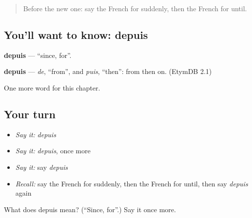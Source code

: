 \begin{quote}
Before the new one: say the French for suddenly, then the French for until.
\end{quote}

\subsection*{You'll want to know: depuis}
\textbf{depuis} — \textquotedblleft{}since, for\textquotedblright{}.

\begin{cousinweb}
\textbf{depuis} — \emph{de}, \textquotedblleft{}from\textquotedblright{}, and \emph{puis}, \textquotedblleft{}then\textquotedblright{}: from then on. (EtymDB 2.1)
\end{cousinweb}

\begin{grammarlens}[title={What you've built}]
One more word for this chapter.
\end{grammarlens}

\subsection*{Your turn}
\begin{itemize}
\raggedright
  \item \emph{Say it:} \emph{depuis}
  \item \emph{Say it:} \emph{depuis}, once more
  \item \emph{Say it:} say \emph{depuis}
  \item \emph{Recall:} say the French for suddenly, then the French for until, then say \emph{depuis} again
\end{itemize}

\begin{tcolorbox}[breakable,colback=teal!4,colframe=teal!35!black,title={Before you move on}]
What does depuis mean? (\textquotedblleft{}Since, for\textquotedblright{}.) Say it once more.
\end{tcolorbox}
